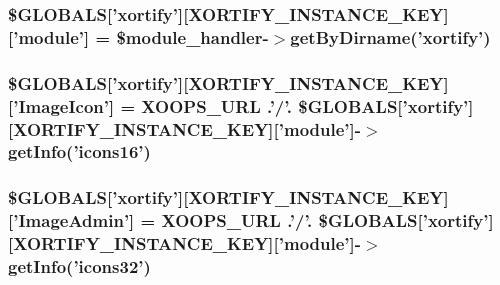 \hypertarget{admin_2index_8php_ade93c98e293ae39806072af3365c6f0e}{
\subsubsection[{\$\-G\-L\-O\-B\-A\-L\-S}]{\setlength{\rightskip}{0pt plus 5cm}\$G\-L\-O\-B\-A\-L\-S\mbox{[}'xortify'\mbox{]}\mbox{[}{\bf X\-O\-R\-T\-I\-F\-Y\-\_\-\-I\-N\-S\-T\-A\-N\-C\-E\-\_\-\-K\-E\-Y}\mbox{]}\mbox{[}'module'\mbox{]} = \$module\-\_\-handler-\/$>$get\-By\-Dirname('xortify')}}\label{admin_2index_8php_ade93c98e293ae39806072af3365c6f0e}
\hypertarget{admin_2index_8php_a64b8ca00cce4671f7e9ca46aa82d0f88}{
\subsubsection[{\$\-G\-L\-O\-B\-A\-L\-S}]{\setlength{\rightskip}{0pt plus 5cm}\$G\-L\-O\-B\-A\-L\-S\mbox{[}'xortify'\mbox{]}\mbox{[}{\bf X\-O\-R\-T\-I\-F\-Y\-\_\-\-I\-N\-S\-T\-A\-N\-C\-E\-\_\-\-K\-E\-Y}\mbox{]}\mbox{[}'Image\-Icon'\mbox{]} = X\-O\-O\-P\-S\-\_\-\-U\-R\-L .'/'. \$G\-L\-O\-B\-A\-L\-S\mbox{[}'xortify'\mbox{]}\mbox{[}{\bf X\-O\-R\-T\-I\-F\-Y\-\_\-\-I\-N\-S\-T\-A\-N\-C\-E\-\_\-\-K\-E\-Y}\mbox{]}\mbox{[}'module'\mbox{]}-\/$>$get\-Info('icons16')}}\label{admin_2index_8php_a64b8ca00cce4671f7e9ca46aa82d0f88}
\hypertarget{admin_2index_8php_a337b648fca998b37a46d84b43aa6e8f9}{
\subsubsection[{\$\-G\-L\-O\-B\-A\-L\-S}]{\setlength{\rightskip}{0pt plus 5cm}\$G\-L\-O\-B\-A\-L\-S\mbox{[}'xortify'\mbox{]}\mbox{[}{\bf X\-O\-R\-T\-I\-F\-Y\-\_\-\-I\-N\-S\-T\-A\-N\-C\-E\-\_\-\-K\-E\-Y}\mbox{]}\mbox{[}'Image\-Admin'\mbox{]} = X\-O\-O\-P\-S\-\_\-\-U\-R\-L .'/'. \$G\-L\-O\-B\-A\-L\-S\mbox{[}'xortify'\mbox{]}\mbox{[}{\bf X\-O\-R\-T\-I\-F\-Y\-\_\-\-I\-N\-S\-T\-A\-N\-C\-E\-\_\-\-K\-E\-Y}\mbox{]}\mbox{[}'module'\mbox{]}-\/$>$get\-Info('icons32')}}\label{admin_2index_8php_a337b648fca998b37a46d84b43aa6e8f9}
